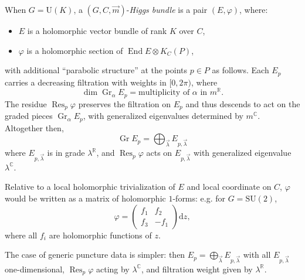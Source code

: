 \documentclass[12pt,letterpaper,reqno]{article}
\numberwithin{equation}{section}
\newcommand{\R}{\ensuremath{\mathbb R}}
\newcommand{\C}{\ensuremath{\mathbb C}}
\newcommand{\de}{\mathrm{d}}
\newcommand{\ti}[1]{\textit{#1}}
\DeclareMathOperator{\End}{End}
\DeclareMathOperator{\Res}{Res}
\DeclareMathOperator{\Gr}{Gr}
\newcommand{\SU}{\mathrm{SU}}
\newcommand{\U}{\mathrm{U}}
\begin{document}
\begin{defn}[Parabolic Higgs bundles for $G = \U(K)$]
When $G = \U(K)$, a $(G, C, \vec m)$-\ti{Higgs bundle} is a pair $(E, \varphi)$, where:
\begin{itemize}
  \item $E$ is a holomorphic vector bundle of rank $K$ over $C$,
  \item $\varphi$ is a holomorphic section of $\End E \otimes K_C(P)$,
\end{itemize}
with additional ``parabolic structure'' at the points $p \in P$
as follows. Each $E_p$ carries a decreasing filtration with weights in $[0,2\pi)$, where 
\begin{equation}
  \dim \Gr_\alpha E_p = \text{multiplicity of $\alpha$ in $m^\R$}.
\end{equation}
The residue $\Res_p \varphi$
preserves the filtration on $E_p$ and thus descends to
act on the graded pieces $\Gr_\alpha E_p$, with generalized
eigenvalues determined by $m^\C$. Altogether then,
\begin{equation}
 \Gr E_p = \bigoplus_{\vec{\lambda}} E_{p,\vec\lambda}
\end{equation}
where $E_{p,\vec\lambda}$ is in grade $\lambda^\R$, and 
$\Res_p \varphi$ acts on $E_{p,\vec\lambda}$
with generalized eigenvalue $\lambda^\C$.
\end{defn}

Relative to a local holomorphic trivialization of $E$
and local coordinate on $C$, $\varphi$ would
be written as a matrix of holomorphic $1$-forms: e.g. for $G = \SU(2)$,
\begin{equation}
  \varphi = \begin{pmatrix} f_1 & f_2 \\ f_3 & -f_1 \end{pmatrix} \de z,
\end{equation}
where all $f_i$ are holomorphic functions of $z$. 

\begin{remark}
The case of generic puncture data is simpler:
then $E_p = \bigoplus_{\vec\lambda} E_{p,\vec\lambda}$
with all $E_{p,\vec\lambda}$ one-dimensional, $\Res_p \varphi$ 
acting by $\lambda^\C$, and filtration weight given by $\lambda^\R$.
\end{remark}
\end{document}
